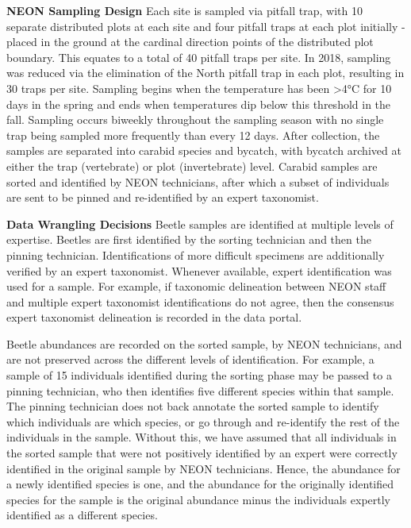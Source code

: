\documentclass[
  12pt,
]{article}
\begin{document}
\textbf{NEON Sampling Design} Each site is sampled via pitfall trap, with 10 separate distributed plots at each site and four pitfall traps at each plot initially - placed in the ground at the cardinal direction points of the distributed plot boundary. This equates to a total of 40 pitfall traps per site. In 2018, sampling was reduced via the elimination of the North pitfall trap in each plot, resulting in 30 traps per site. Sampling begins when the temperature has been \textgreater4°C for 10 days in the spring and ends when temperatures dip below this threshold in the fall. Sampling occurs biweekly throughout the sampling season with no single trap being sampled more frequently than every 12 days. After collection, the samples are separated into carabid species and bycatch, with bycatch archived at either the trap (vertebrate) or plot (invertebrate) level. Carabid samples are sorted and identified by NEON technicians, after which a subset of individuals are sent to be pinned and re-identified by an expert taxonomist.

\textbf{Data Wrangling Decisions} Beetle samples are identified at multiple levels of expertise. Beetles are first identified by the sorting technician and then the pinning technician. Identifications of more difficult specimens are additionally verified by an expert taxonomist. Whenever available, expert identification was used for a sample. For example, if taxonomic delineation between NEON staff and multiple expert taxonomist identifications do not agree, then the consensus expert taxonomist delineation is recorded in the data portal.

Beetle abundances are recorded on the sorted sample, by NEON technicians, and are not preserved across the different levels of identification. For example, a sample of 15 individuals identified during the sorting phase may be passed to a pinning technician, who then identifies five different species within that sample. The pinning technician does not back annotate the sorted sample to identify which individuals are which species, or go through and re-identify the rest of the individuals in the sample. Without this, we have assumed that all individuals in the sorted sample that were not positively identified by an expert were correctly identified in the original sample by NEON technicians. Hence, the abundance for a newly identified species is one, and the abundance for the originally identified species for the sample is the original abundance minus the individuals expertly identified as a different species.
\end{document}
